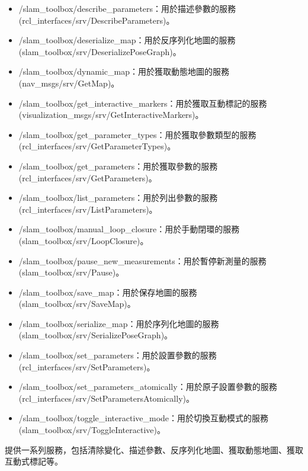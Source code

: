 \begin{itemize}
\begin{itemize}
        \item /slam\_toolbox/describe\_parameters：用於描述參數的服務 
            \\(rcl\_interfaces/srv/DescribeParameters)。
        \item /slam\_toolbox/deserialize\_map：用於反序列化地圖的服務 
            \\(slam\_toolbox/srv/DeserializePoseGraph)。
        \item /slam\_toolbox/dynamic\_map：用於獲取動態地圖的服務 
            \\(nav\_msgs/srv/GetMap)。
        \item /slam\_toolbox/get\_interactive\_markers：用於獲取互動標記的服務 
            \\(visualization\_msgs/srv/GetInteractiveMarkers)。
        \item /slam\_toolbox/get\_parameter\_types：用於獲取參數類型的服務 
            \\(rcl\_interfaces/srv/GetParameterTypes)。
        \item /slam\_toolbox/get\_parameters：用於獲取參數的服務 
            \\(rcl\_interfaces/srv/GetParameters)。
        \item /slam\_toolbox/list\_parameters：用於列出參數的服務 
            \\(rcl\_interfaces/srv/ListParameters)。
        \item /slam\_toolbox/manual\_loop\_closure：用於手動閉環的服務 
            \\(slam\_toolbox/srv/LoopClosure)。
        \item /slam\_toolbox/pause\_new\_measurements：用於暫停新測量的服務 (slam\_toolbox/srv/Pause)。
        \item /slam\_toolbox/save\_map：用於保存地圖的服務 (slam\_toolbox/srv/SaveMap)。
        \item /slam\_toolbox/serialize\_map：用於序列化地圖的服務 (slam\_toolbox/srv/SerializePoseGraph)。
        \item /slam\_toolbox/set\_parameters：用於設置參數的服務 (rcl\_interfaces/srv/SetParameters)。
        \item /slam\_toolbox/set\_parameters\_atomically：用於原子設置參數的服務 
            \\(rcl\_interfaces/srv/SetParametersAtomically)。
        \item /slam\_toolbox/toggle\_interactive\_mode：用於切換互動模式的服務 
            \\(slam\_toolbox/srv/ToggleInteractive)。
    \end{itemize}
\end{itemize}
提供一系列服務，包括清除變化、描述參數、反序列化地圖、獲取動態地圖、獲取互動式標記等。

